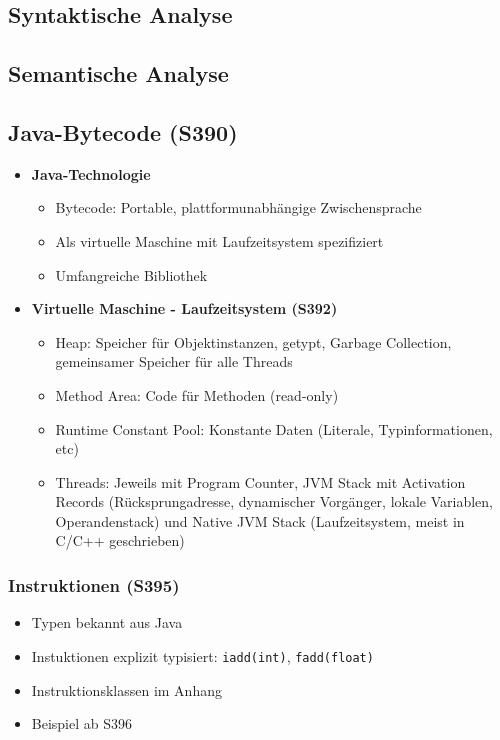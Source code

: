 \subsection{Syntaktische Analyse}


\subsection{Semantische Analyse}


\subsection{Java-Bytecode (S390)}
\begin{itemize}
	\item \textbf{Java-Technologie}
	\begin{itemize}
		\item Bytecode: Portable, plattformunabhängige Zwischensprache
		\item Als virtuelle Maschine mit Laufzeitsystem spezifiziert
		\item Umfangreiche Bibliothek
	\end{itemize}
	\item \textbf{Virtuelle Maschine - Laufzeitsystem (S392)}
	\begin{itemize}
		\item Heap: Speicher für Objektinstanzen, getypt, Garbage Collection, gemeinsamer Speicher für alle Threads
		\item Method Area: Code für Methoden (read-only)
		\item Runtime Constant Pool: Konstante Daten (Literale, Typinformationen, etc)
		\item Threads: Jeweils mit Program Counter, JVM Stack mit Activation Records (Rücksprungadresse, dynamischer Vorgänger, lokale Variablen, Operandenstack) und Native JVM Stack (Laufzeitsystem, meist in C/C++ geschrieben) 
	\end{itemize}
\end{itemize}

\subsubsection{Instruktionen (S395)}
\begin{itemize}
	\item Typen bekannt aus Java
	\item Instuktionen explizit typisiert: \texttt{iadd(int)}, \texttt{fadd(float)}
	\item Instruktionsklassen im Anhang
	\item Beispiel ab S396
\end{itemize}


